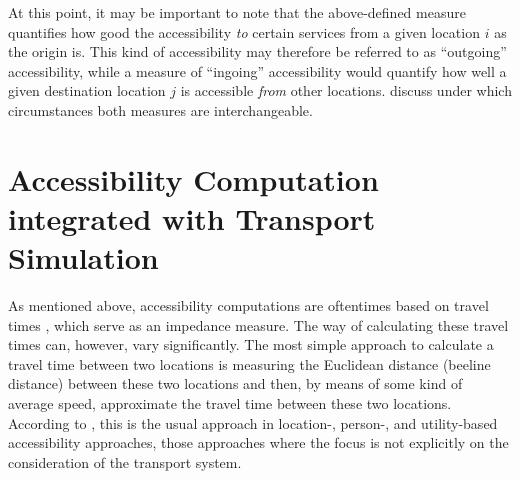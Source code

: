 At this point, it may be important to note that the above-defined measure quantifies how good the accessibility \emph{to} 
certain services from a given location $i$ as the origin is. This kind of accessibility may therefore be referred to 
as ``outgoing'' accessibility, while a measure of ``ingoing'' accessibility would quantify how well a given destination 
location $j$ is accessible \emph{from} other locations. \citet{NicolaiNagel2012HiResAccessibilityMethodInBook} 
discuss under which circumstances both measures are interchangeable.

\section{Accessibility Computation integrated with Transport Simulation}
\label{sec:integrated}
As mentioned above, accessibility computations are oftentimes based on travel times 
\citep{BBSR20xxErreichbarkeitsmodell, BuettnerEtAl2010Erreichbarkeitsatlas}
, which serve as an impedance measure. The way of calculating these travel times can, however, vary significantly. 
The most simple approach to calculate a travel time between two locations is measuring the Euclidean distance 
(beeline distance) between these two locations and then, by means of some kind of average speed, approximate the 
travel time between these two locations. According to \citet{Geurs2004AccessibilityReview}, this is the usual 
approach in location-, person-, and utility-based accessibility approaches, \ie those approaches where the focus 
is not explicitly on the consideration of the transport system.



